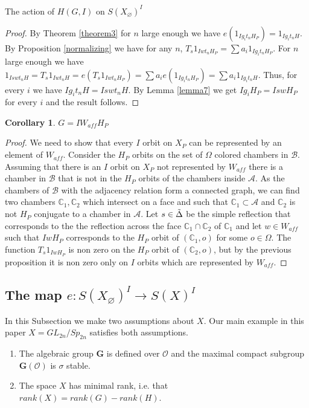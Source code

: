 \documentclass[12pt]{article}
\newcommand{\A}{\mathcal{A}}
\newcommand{\B}{\mathcal{B}}
\newcommand{\C}{\mathbb{C}}
\newcommand{\s}{\mathcal{O}}
\newcommand{\<}{\langle}
\renewcommand{\>}{\rangle}
\renewcommand{\emptyset}{\varnothing}
\theoremstyle{plain}
\theoremstyle{definition}
\newtheorem{cor}[theorem]{Corollary}
\begin{document}
\begin{subsection}{The action of $H(G,I)$ on $S(X_\emptyset)^I$}
\begin{proof}
By Theorem \ref{theorem3} for $n$ large enough we have $e(1_{Ig_it_nH_P})=1_{Ig_it_nH}$. By Proposition \ref{normalizing} we have for any $n$, $T_s1_{Iwt_nH_P}=\sum a_i1_{Ig_it_nH_P}$. For $n$ large enough we have $1_{Iswt_nH}=T_s1_{Iwt_nH}=e(T_s1_{Iwt_nH_P})=\sum a_ie(1_{Ig_it_nH_P})=\sum a_i1_{Ig_it_nH}$. Thus, for every $i$ we have $Ig_it_nH=Iswt_nH$. By Lemma \ref{lemma7}  we get $Ig_iH_P=IswH_P$ for every $i$ and the result follows.
\end{proof}

\begin{cor}
     $G=IW_{aff}H_P$
\end{cor}

\begin{proof}
    We need to show that every $I$ orbit on $X_P$ can be represented by an element of $W_{aff}$. Consider the $H_P$ orbits on the set of $\Omega$ colored chambers in $\B$. Assuming that there is an $I$ orbit on $X_P$ not represented by $W_{aff}$ there is a chamber in $\B$ that is not in the $H_P$ orbits of the chambers inside $\A$. As the chambers of $\B$ with the adjacency relation form a connected graph, we can find two chambers $\C_1,\C_2$ which intersect on a face and such that $\C_1\subset \A$ and $\C_2$ is not $H_P$ conjugate to a chamber in $\A$. Let $s\in\Tilde{\Delta}$ be the simple reflection that corresponds to the the reflection across the face $\C_1\cap\C_2$ of $\C_1$ and let $w\in W_{aff}$ such that $IwH_P$ corresponds to the $H_P$ orbit of $(\C_1,o)$ for some $o\in \Omega$. The function $T_s1_{IwH_P}$ is non zero on the $H_P$ orbit of $(\C_2,o)$, but by the previous proposition it is non zero only on $I$ orbits which are represented by $W_{aff}$.
\end{proof}
\end{subsection}

\subsection{The map $e:S(X_\emptyset)^I \to S(X)^I$}

In this Subsection we make two assumptions about $X$. Our main example in this paper $X=GL_{2n}/Sp_{2n}$ satisfies both assumptions. 

\begin{enumerate}
    \item The algebraic group $\mathbf{G}$ is defined over $\s$ and the maximal compact subgroup $\mathbf{G}(\s)$ is $\sigma$ stable.
    \item The space $X$ has minimal rank, i.e. that $rank(X)=rank(G)-rank(H)$. 
 \end{enumerate}
\end{document}
